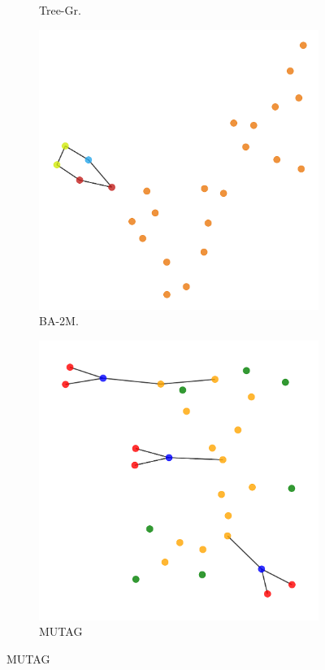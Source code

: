 \begin{figure}[h]
\begin{subfigure}[b]{0.15\textwidth}
        \caption{\scriptsize Tree-Gr.}
        \label{fig:qual_grid}
    \end{subfigure}
    \begin{subfigure}[b]{0.15\textwidth}
        \includegraphics[width=\linewidth]{img/BA-2Motif/graph_3_explanation.pdf}
        \caption{\scriptsize BA-2M.}
        \label{fig:qual_2M}
    \end{subfigure}
    \begin{subfigure}[b]{0.15\textwidth}
        \includegraphics[width=\linewidth]{img/MUTAG/graph_12_explanation.pdf}
        \caption{\scriptsize MUTAG}
        \label{fig:qual_MUTAG}
    \end{subfigure}
    

\end{figure}
